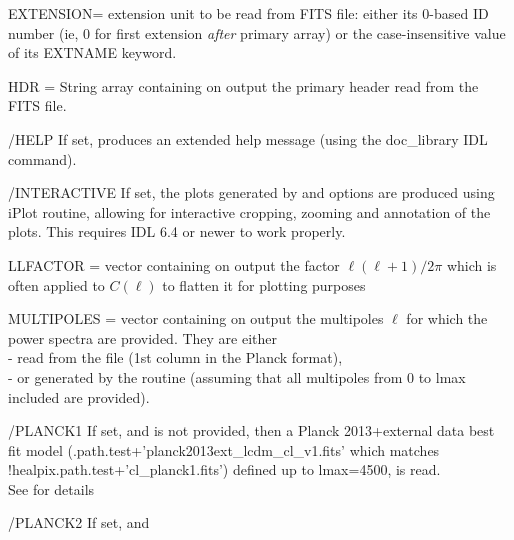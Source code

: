 \begin{keywords}
  \begin{kwlist}{} %
       \item[EXTENSION=]%
	extension unit to be read from FITS file: 
 either its 0-based ID number (ie, 0 for first extension {\em after} primary array) 
 or the case-insensitive value of its EXTNAME keyword.
    \item[HDR =] %
	String array containing on output the primary header
      read from the FITS file. 
    \item[/HELP] %
	If set, produces an extended help message (using the doc\_library
    IDL command). 
    \item[/INTERACTIVE] %
	If set, the plots generated by  and  options are produced using iPlot routine, allowing 
           for interactive cropping, zooming and annotation of the plots. This
           requires IDL 6.4 or newer to work properly.
    \item[LLFACTOR =] %
	vector containing on output the factor $\ell(\ell+1)/2\pi$ which is often
          applied to $C(\ell)$ to flatten it for plotting purposes
    \item[MULTIPOLES =] %
	vector containing on output the multipoles
    $\ell$ for which the power spectra are provided. They are either\\
           - read from the file (1st column in the Planck format),\\
          - or generated by the routine (assuming that all
               multipoles from 0 to lmax included are provided).
%
    \item[/PLANCK1] %
           If set, and  
           is not provided, then a Planck 2013+external data best fit
          model (.path.test+\-'planck2013ext\_lcdm\_cl\_v1.fits'
which matches !healpix.path.test+'cl\_planck1.fits') 
          defined up to lmax=4500, is read.\\
          See  for details
%
    \item[/PLANCK2] %
           If set, and  

\end{kwlist}
\end{keywords}
